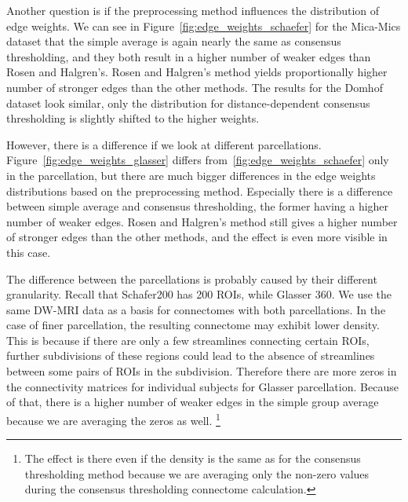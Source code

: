 Another question is if the preprocessing method influences the distribution of edge weights. We can see in Figure~\ref{fig:edge_weights_schaefer} for the Mica-Mics dataset that the simple average is again nearly the same as consensus thresholding, and they both result in a higher number of weaker edges than Rosen and Halgren's. Rosen and Halgren's method yields proportionally higher number of stronger edges than the other methods. The results for the Domhof dataset look similar, only the distribution for distance-dependent consensus thresholding is slightly shifted to the higher weights.

However, there is a difference if we look at different parcellations. Figure~\ref{fig:edge_weights_glasser} differs from~\ref{fig:edge_weights_schaefer} only in the parcellation, but there are much bigger differences in the edge weights distributions based on the preprocessing method. Especially there is a difference between simple average and consensus thresholding, the former having a higher number of weaker edges. Rosen and Halgren's method still gives a higher number of stronger edges than the other methods, and the effect is even more visible in this case.

The difference between the parcellations is probably caused by their different granularity. Recall that Schafer200 has 200 ROIs, while Glasser 360. We use the same DW-MRI data as a basis for connectomes with both parcellations. In the case of finer parcellation, the resulting connectome may exhibit lower density. This is because if there are only a few streamlines connecting certain ROIs, further subdivisions of these regions could lead to the absence of streamlines between some pairs of ROIs in the subdivision. Therefore there are more zeros in the connectivity matrices for individual subjects for Glasser parcellation. Because of that, there is a higher number of weaker edges in the simple group average because we are averaging the zeros as well. \footnote{The effect is there even if the density is the same as for the consensus thresholding method because we are averaging only the non-zero values during the consensus thresholding connectome calculation.}

